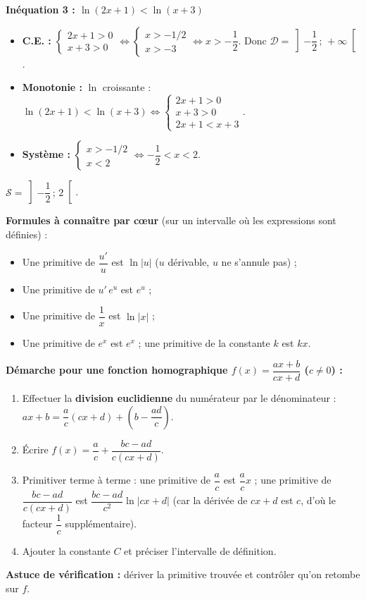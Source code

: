 \documentclass[11pt]{article}
\begin{document}
\begin{exoresolu}
\textbf{Inéquation 3 : $\ln(2x+1) < \ln(x+3)$}
\begin{itemize}
    \item \textbf{C.E. :} $\begin{cases} 2x+1 > 0 \\ x+3 > 0 \end{cases} \iff \begin{cases} x > -1/2 \\ x > -3 \end{cases} \iff x > -\dfrac12$. Donc $\mathcal{D} = \left]-\dfrac12\,;\, +\infty\right[$.
    \item \textbf{Monotonie :} $\ln$ croissante : $\ln(2x+1) < \ln(x+3) \iff \begin{cases} 2x+1 > 0 \\ x+3 > 0 \\ 2x+1 < x+3 \end{cases}$.
    \item \textbf{Système :} $\begin{cases} x > -1/2 \\ x < 2 \end{cases} \iff -\dfrac12 < x < 2$.
\end{itemize}
$\mathcal{S} = \left]-\dfrac12\,;\, 2\right[$.
\end{exoresolu}

\begin{methode}
\textbf{Formules à connaître par cœur} (sur un intervalle où les expressions sont définies) :
\begin{itemize}
    \item Une primitive de $\dfrac{u'}{u}$ est $\ln|u|$ \quad ($u$ dérivable, $u$ ne s'annule pas) ;
    \item Une primitive de $u'\, e^{u}$ est $e^{u}$ ;
    \item Une primitive de $\dfrac{1}{x}$ est $\ln|x|$ ;
    \item Une primitive de $e^x$ est $e^x$ ; une primitive de la constante $k$ est $kx$.
\end{itemize}
\textbf{Démarche pour une fonction homographique $f(x)=\dfrac{ax+b}{cx+d}$ ($c\neq 0$) :}
\begin{enumerate}
    \item Effectuer la \textbf{division euclidienne} du numérateur par le dénominateur : $ax+b = \dfrac{a}{c}(cx+d) + \left(b-\dfrac{ad}{c}\right)$.
    \item Écrire $f(x) = \dfrac{a}{c} + \dfrac{bc-ad}{c(cx+d)}$.
    \item Primitiver terme à terme : une primitive de $\dfrac{a}{c}$ est $\dfrac{a}{c}x$ ; une primitive de $\dfrac{bc-ad}{c(cx+d)}$ est $\dfrac{bc-ad}{c^2}\ln|cx+d|$ (car la dérivée de $cx+d$ est $c$, d'où le facteur $\dfrac{1}{c}$ supplémentaire).
    \item Ajouter la constante $C$ et préciser l'intervalle de définition.
\end{enumerate}
\textbf{Astuce de vérification :} dériver la primitive trouvée et contrôler qu'on retombe sur $f$.
\end{methode}
\end{document}

